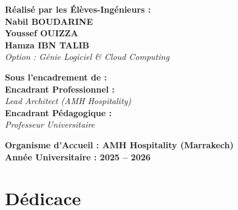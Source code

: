 \begin{titlepage}
\begin{center}
\begin{minipage}[t]{0.52\textwidth}
  \textbf{\textcolor{primaryBlue}{Réalisé par les Élèves-Ingénieurs :}}\\[0.25cm]
  {\large \textbf{Nabil BOUDARINE}}\\[0.15cm]
  {\large \textbf{Youssef OUIZZA}}\\[0.15cm]
  {\large \textbf{Hamza IBN TALIB}}\\[0.2cm]
  \textit{Option : Génie Logiciel \& Cloud Computing}
\end{minipage}
\hfill
\begin{minipage}[t]{0.48\textwidth}
  \raggedleft
  \textbf{\textcolor{primaryBlue}{Sous l'encadrement de :}}\\[0.2cm]
  \textbf{Encadrant Professionnel :}\\\textit{Lead Architect (AMH Hospitality)}\\[0.2cm]
  \textbf{Encadrant Pédagogique :}\\\textit{Professeur Universitaire}
\end{minipage}

\vfill

{\large \textbf{Organisme d'Accueil : AMH Hospitality (Marrakech)}}\\[0.3cm]
{\normalsize \textbf{Année Universitaire : 2025 -- 2026}}

\end{center}
\end{titlepage}

\setcounter{page}{1}

\chapter*{Dédicace}

